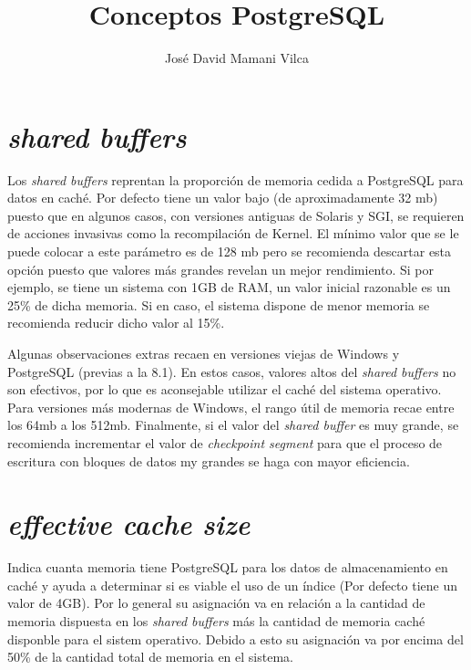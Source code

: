 \documentclass[12pt,conference]{IEEEtran}
\begin{document}
\title{Conceptos PostgreSQL}

\author{José David Mamani Vilca}%

\onecolumn

\maketitle

\section{\textit{shared buffers}}

Los \textit{shared buffers} reprentan la proporción de memoria cedida a PostgreSQL para datos en caché. Por defecto tiene un valor bajo (de aproximadamente 32 mb) puesto que en algunos casos, con versiones antiguas de Solaris y SGI, se requieren de acciones invasivas como la recompilación de Kernel. El mínimo valor que se le puede colocar a este parámetro es de 128 mb pero se recomienda descartar esta opción puesto que valores más grandes revelan un mejor rendimiento. Si por ejemplo, se tiene un sistema con 1GB de RAM, un valor inicial razonable es un 25\% de dicha memoria. Si en caso, el sistema dispone de menor memoria se recomienda reducir dicho valor al 15\%.

Algunas observaciones extras recaen en versiones viejas de Windows y PostgreSQL (previas a la 8.1). En estos casos, valores altos del \textit{shared buffers} no son efectivos, por lo que es aconsejable utilizar el caché del sistema operativo. Para versiones más modernas de Windows, el rango útil de memoria recae entre los 64mb a los 512mb. Finalmente, si el valor del  \textit{shared buffer} es muy grande, se recomienda incrementar el valor de \textit{checkpoint segment} para que el proceso de escritura con bloques de datos my grandes se haga con mayor eficiencia.

\section{\textit{effective cache size}}

Indica cuanta memoria tiene PostgreSQL para los datos de almacenamiento en caché y ayuda a determinar si es viable el uso de un índice (Por defecto tiene un valor de 4GB). Por lo general su asignación va en relación a la cantidad de memoria dispuesta en los \textit{shared buffers} más la cantidad de memoria caché disponble para el	 sistem operativo. Debido a esto su asignación va por encima del 50\% de la cantidad total de memoria en el sistema.
\end{document}

